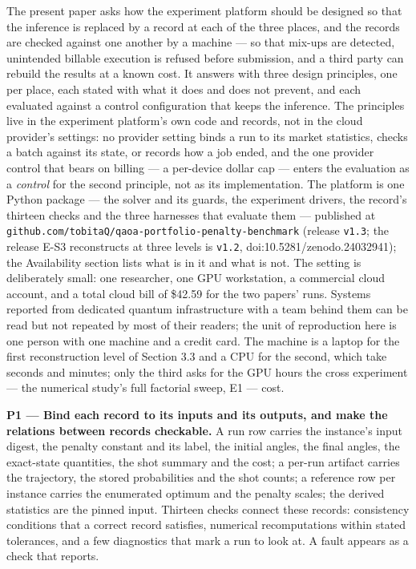 \documentclass[acmsmall,screen,review]{acmart}
\begin{document}
The present paper asks how the experiment platform should be designed so that the inference is replaced by a record at each of the three places, and the records are checked against one another by a machine --- so that mix-ups are detected, unintended billable execution is refused before submission, and a third party can rebuild the results at a known cost. It answers with three design principles, one per place, each stated with what it does and does not prevent, and each evaluated against a control configuration that keeps the inference. The principles live in the experiment platform's own code and records, not in the cloud provider's settings: no provider setting binds a run to its market statistics, checks a batch against its state, or records how a job ended, and the one provider control that bears on billing --- a per-device dollar cap --- enters the evaluation as a \textit{control} for the second principle, not as its implementation. The platform is one Python package --- the solver and its guards, the experiment drivers, the record's thirteen checks and the three harnesses that evaluate them --- published at \texttt{github.\allowbreak{}com/\allowbreak{}tobita\allowbreak{}Q/\allowbreak{}qaoa-\allowbreak{}portfolio-\allowbreak{}penalty-\allowbreak{}benchmark} (release \texttt{v1.3}; the release E-S3 reconstructs at three levels is \texttt{v1.2}, doi:10.5281/zenodo.24032941); the Availability section lists what is in it and what is not. The setting is deliberately small: one researcher, one GPU workstation, a commercial cloud account, and a total cloud bill of \$42.59 for the two papers' runs. Systems reported from dedicated quantum infrastructure with a team behind them can be read but not repeated by most of their readers; the unit of reproduction here is one person with one machine and a credit card. The machine is a laptop for the first reconstruction level of Section 3.3 and a CPU for the second, which take seconds and minutes; only the third asks for the GPU hours the cross experiment --- the numerical study's full factorial sweep, E1 --- cost.


\textbf{P1 --- Bind each record to its inputs and its outputs, and make the relations between records checkable.} A run row carries the instance's input digest, the penalty constant and its label, the initial angles, the final angles, the exact-state quantities, the shot summary and the cost; a per-run artifact carries the trajectory, the stored probabilities and the shot counts; a reference row per instance carries the enumerated optimum and the penalty scales; the derived statistics are the pinned input. Thirteen checks connect these records: consistency conditions that a correct record satisfies, numerical recomputations within stated tolerances, and a few diagnostics that mark a run to look at. A fault appears as a check that reports.
\end{document}
